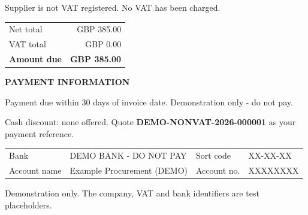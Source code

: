 \documentclass[10pt,a4paper]{article}
\begin{document}
\begin{minipage}{\textwidth}
\raggedright

{\small\color{muted}Supplier is not VAT registered. No VAT has been charged.}

\vspace{3mm}
\begin{flushright}
\begin{tabular}{@{}lr@{}}
Net total & GBP 385.00 \\
VAT total & GBP 0.00 \\
\midrule
{\large\bfseries Amount due} & {\large\bfseries GBP 385.00} \\
\end{tabular}
\end{flushright}
\vspace{3mm}
{\small\bfseries PAYMENT INFORMATION}\par
{\small Payment due within 30 days of invoice date. Demonstration only - do not pay.\par
Cash discount: none offered. Quote \textbf{DEMO-NONVAT-2026-000001} as your payment reference.}
\vspace{2mm}
\colorbox{pale}{\parbox{\dimexpr\textwidth-2\fboxsep\relax}{\small
\begin{tabularx}{\linewidth}{@{}l X l X@{}}
Bank & DEMO BANK - DO NOT PAY & Sort code & XX-XX-XX \\
Account name & Example Procurement (DEMO) & Account no. & XXXXXXXX \\
\end{tabularx}}}

\par{\footnotesize\color{demo}Demonstration only. The company, VAT and bank identifiers are test placeholders.}

\end{minipage}
\end{document}
